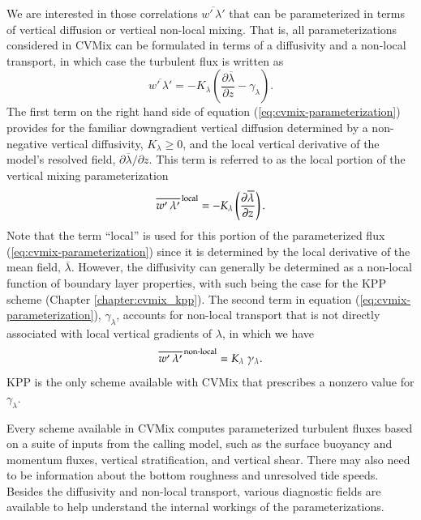 We are interested in those correlations $\overline{w' \, \lambda'}$
that can be parameterized in terms of vertical diffusion or vertical
non-local mixing.  That is, all parameterizations considered in CVMix
can be formulated in terms of a diffusivity and a non-local transport,
in which case the turbulent flux is written as
\begin{equation}
  \overline{w' \, \lambda'} = 
  -K_{\lambda} \left( \frac{\partial \overline{\lambda}}{\partial z} - \gamma_{\lambda} \right).
\label{eq:cvmix-parameterization}
\end{equation}
The first term on the right hand side of equation
(\ref{eq:cvmix-parameterization}) provides for the familiar
downgradient vertical diffusion determined by a non-negative vertical
diffusivity, $K_{\lambda} \ge 0$, and the local vertical derivative of
the model's resolved field, $\partial \overline{\lambda} / \partial
z$.  This term is referred to as the local portion of the vertical
mixing parameterization
\begin{equation}
\overline{ w' \, \lambda' }^{\, \mbox{\scriptsize local}} = -K_{\lambda} \left( \frac{\partial \overline{\lambda}}{\partial z} \right).
\end{equation}
Note that the term ``local'' is used for this portion of the
parameterized flux (\ref{eq:cvmix-parameterization}) since it is
determined by the local derivative of the mean field,
$\overline{\lambda}$.  However, the diffusivity can generally be
determined as a non-local function of boundary layer properties, with
such being the case for the KPP scheme (Chapter
\ref{chapter:cvmix_kpp}).  The second term in equation
(\ref{eq:cvmix-parameterization}), $\gamma_{\lambda}$, accounts for
non-local transport that is not directly associated with local
vertical gradients of $\lambda$, in which we have
\begin{equation}
\overline{w' \, \lambda'}^{\, \mbox{\scriptsize non-local}} = K_{\lambda} \; \gamma_{\lambda}.
\end{equation}
KPP is the only scheme available with CVMix that prescribes a nonzero
value for $\gamma_{\lambda}$.  

Every scheme available in CVMix computes parameterized turbulent
fluxes based on a suite of inputs from the calling model, such as the
surface buoyancy and momentum fluxes, vertical stratification, and
vertical shear.  There may also need to be information about the
bottom roughness and unresolved tide speeds.  Besides the diffusivity
and non-local transport, various diagnostic fields are available to
help understand the internal workings of the parameterizations.



